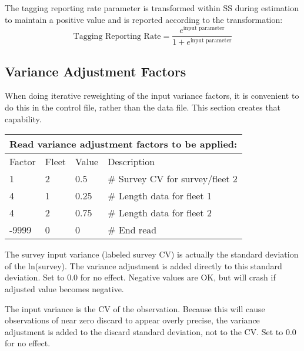 The tagging reporting rate parameter is transformed within SS during estimation to maintain a positive value and is reported according to the transformation:
\begin{equation}
	\text{Tagging Reporting Rate} = \frac{e^{\text{input parameter}}}{1+e^{\text{input parameter}}}
\end{equation}

\hypertarget{GcompVar}{}
\subsection{Variance Adjustment Factors}
When doing iterative reweighting of the input variance factors, it is convenient to do this in the control file, rather than the data file.  This section creates that capability.


\begin{longtable}{p{3cm} p{3cm} p{2.5cm} p{6.25cm} }

	\multicolumn{4}{l}{Read variance adjustment factors to be applied:}\\
	\hline
	Factor & Fleet & Value & Description \Tstrut\Bstrut\\
	\hline
	1 & 2 & 0.5 & \# Survey CV for survey/fleet 2 \Tstrut\\
	4 & 1 & 0.25 & \# Length data for fleet 1 \\
	4 & 2 & 0.75 & \# Length data for fleet 2\\
	-9999 & 0 & 0 & \# End read\Bstrut\\
	\hline
\end{longtable}


The survey input variance (labeled survey CV) is actually the standard deviation of the ln(survey).  The variance adjustment is added directly to this standard deviation.  Set to 0.0 for no effect.  Negative values are OK, but will crash if adjusted value becomes negative.

The input variance is the CV of the observation.  Because this will cause observations of near zero discard to appear overly precise, the variance adjustment is added to the discard standard deviation, not to the CV.  Set to 0.0 for no effect.

